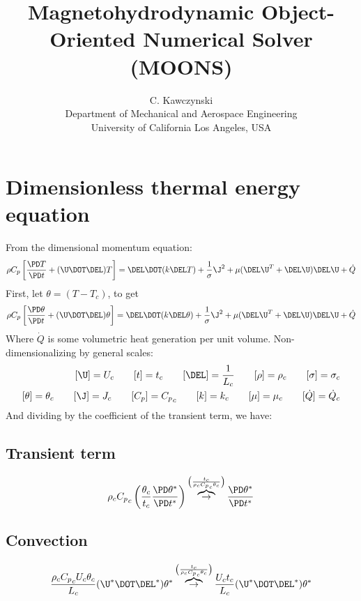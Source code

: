 \documentclass[11pt]{article}
\newcommand{\OB}{\overbrace{\rightarrow}^{\left(\frac{t_c}{\rho_c {C_p}_c \theta_c}\right)}}
\newcommand{\Cp}{{C_p}_c}
\begin{document}
\doublespacing
\title{Magnetohydrodynamic Object-Oriented Numerical Solver (MOONS)}
\author{C. Kawczynski \\
Department of Mechanical and Aerospace Engineering \\
University of California Los Angeles, USA\\
}
\maketitle

\section{Dimensionless thermal energy equation}
From the dimensional momentum equation:
\begin{equation}
	\rho C_p \left[ \frac{\PD T}{\PD t} 
	+ (\U \DOT \DEL) T \right] 
	= \DEL \DOT (k \DEL T) 
	+ \frac{1}{\sigma} \J^2 
	+ \mu ( \DEL \U^T + \DEL \U ) \DEL \U
	+ \dot{Q}
\end{equation}
First, let $\theta = (T - T_c)$, to get
\begin{equation}
	\rho C_p \left[ \frac{\PD \theta}{\PD t} 
	+ (\U \DOT \DEL) \theta \right] 
	= \DEL \DOT (k \DEL \theta) 
	+ \frac{1}{\sigma} \J^2 
	+ \mu ( \DEL \U^T + \DEL \U ) \DEL \U
	+ \dot{Q}
\end{equation}
Where $\dot{Q}$ is some volumetric heat generation per unit volume. Non-dimensionalizing by general scales:
\begin{equation}\begin{aligned}
	[\U] = U_c \qquad
	[t] = t_c \qquad
	[\DEL] = \frac{1}{L_c} \qquad
	[\rho] = \rho_c \qquad
	[\sigma] = \sigma_c \\
	[\theta] = \theta_c \qquad
	[\J] = J_c \qquad
	[C_p] = \Cp \qquad
	[k] = k_c \qquad
	[\mu] = \mu_c \qquad
	[\dot{Q}] = \dot{Q}_c
\end{aligned}\end{equation}
And dividing by the coefficient of the transient term, we have:
\subsection{Transient term}
\begin{equation}
	\rho_c \Cp \left( \frac{\theta_c}{t_c} \frac{\PD \theta^*}{\PD t^*} \right) 
	\OB
	\frac{\PD \theta^*}{\PD t^*}
\end{equation}
\subsection{Convection}
\begin{equation}
	\frac{\rho_c \Cp U_c \theta_c}{L_c} (\U^* \DOT \DEL^*) \theta^*
	\OB
	\frac{U_c t_c}{L_c} (\U^* \DOT \DEL^*) \theta^*
\end{equation}
\end{document}
